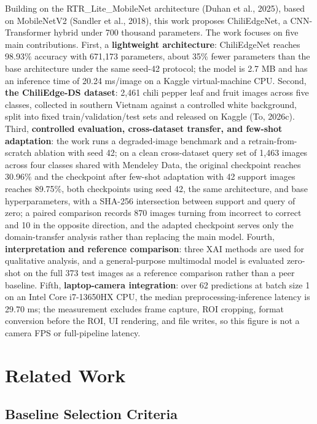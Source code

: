 Building on the RTR\_Lite\_MobileNet architecture (Duhan et al., 2025), based on MobileNetV2 (Sandler et al., 2018), this work proposes ChiliEdgeNet, a CNN-Transformer hybrid under 700 thousand parameters. The work focuses on five main contributions. First, a \textbf{lightweight architecture}: ChiliEdgeNet reaches 98.93\% accuracy with 671,173 parameters, about 35\% fewer parameters than the base architecture under the same seed-42 protocol; the model is 2.7 MB and has an inference time of 20.24 ms/image on a Kaggle virtual-machine CPU. Second, \textbf{the ChiliEdge-DS dataset}: 2,461 chili pepper leaf and fruit images across five classes, collected in southern Vietnam against a controlled white background, split into fixed train/validation/test sets and released on Kaggle (To, 2026c). Third, \textbf{controlled evaluation, cross-dataset transfer, and few-shot adaptation}: the work runs a degraded-image benchmark and a retrain-from-scratch ablation with seed 42; on a clean cross-dataset query set of 1,463 images across four classes shared with Mendeley Data, the original checkpoint reaches 30.96\% and the checkpoint after few-shot adaptation with 42 support images reaches 89.75\%, both checkpoints using seed 42, the same architecture, and base hyperparameters, with a SHA-256 intersection between support and query of zero; a paired comparison records 870 images turning from incorrect to correct and 10 in the opposite direction, and the adapted checkpoint serves only the domain-transfer analysis rather than replacing the main model. Fourth, \textbf{interpretation and reference comparison}: three XAI methods are used for qualitative analysis, and a general-purpose multimodal model is evaluated zero-shot on the full 373 test images as a reference comparison rather than a peer baseline. Fifth, \textbf{laptop-camera integration}: over 62 predictions at batch size 1 on an Intel Core i7-13650HX CPU, the median preprocessing-inference latency is 29.70 ms; the measurement excludes frame capture, ROI cropping, format conversion before the ROI, UI rendering, and file writes, so this figure is not a camera FPS or full-pipeline latency.

\FloatBarrier

\section{Related Work}\label{related-work}

\subsection{Baseline Selection Criteria}\label{baseline-selection-criteria}

